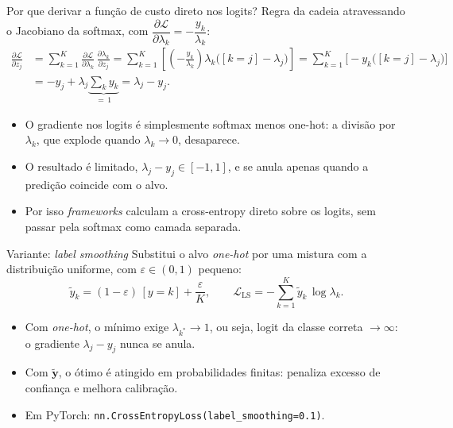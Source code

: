 \documentclass[aspectratio=169,xcolor=dvipsnames]{beamer}
\begin{document}
  \begin{frame}{Por que derivar a função de custo direto nos logits?}
    Regra da cadeia atravessando o Jacobiano da softmax, com
    $\dfrac{\partial \mathcal{L}}{\partial \lambda_k} = -\dfrac{y_k}{\lambda_k}$:
    \begin{align*}
      \frac{\partial \mathcal{L}}{\partial z_j}
        &= \sum_{k=1}^{K} \frac{\partial \mathcal{L}}{\partial \lambda_k}\,
           \frac{\partial \lambda_k}{\partial z_j}
         = \sum_{k=1}^{K} \left[\left(-\frac{y_k}{\lambda_k}\right)\lambda_k\big([k=j]-\lambda_j\big)\right]
         = \sum_{k=1}^{K} \Big[-y_k\big([k=j]-\lambda_j\big)\Big] \\
        &= -y_j + \lambda_j\underbrace{\textstyle\sum_{k} y_k}_{=\,1}
         = \lambda_j - y_j.
    \end{align*}
    \begin{itemize}
      \item O gradiente nos logits é simplesmente \alert{softmax menos one-hot}:
        a divisão por $\lambda_k$, que explode quando $\lambda_k \to 0$, desaparece.
      \item O resultado é limitado, $\lambda_j - y_j \in [-1, 1]$, e se anula apenas quando a
        predição coincide com o alvo.
      \item Por isso \textit{frameworks} calculam a cross-entropy direto sobre os logits,
        sem passar pela softmax como camada separada.
    \end{itemize}
  \end{frame}

  \begin{frame}{Variante: \textit{label smoothing}}
    Substitui o alvo \textit{one-hot} por uma mistura com a distribuição
    uniforme, com $\varepsilon\in(0,1)$ pequeno:
    \[
      \tilde y_k = (1-\varepsilon)\,[y=k] + \frac{\varepsilon}{K},
      \qquad
      \mathcal{L}_{\text{LS}} = -\sum_{k=1}^{K}\tilde y_k\,\log\lambda_k.
    \]
    \begin{itemize}
      \item Com \textit{one-hot}, o mínimo exige $\lambda_{k^{*}}\to 1$, ou seja, logit da classe
        correta $\to\infty$: o gradiente $\lambda_j - y_j$ nunca se anula.
      \item Com $\tilde{\mathbf{y}}$, o ótimo é atingido em probabilidades finitas: penaliza
        excesso de confiança e melhora calibração.
      \item Em PyTorch: \texttt{nn.CrossEntropyLoss(label\_smoothing=0.1)}.
    \end{itemize}
  \end{frame}
\end{document}
